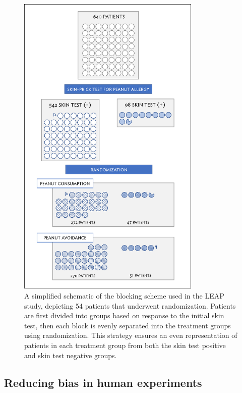 \begin{doublespace}
	\begin{figure}
		\centering
		\includegraphics[width=0.78\textwidth]{ch_intro_to_data_oi_biostat/figures/leapBlocking/leapBlocking.png}
		\caption{A simplified schematic of the blocking scheme used in the LEAP study, depicting 54 patients that underwent randomization. Patients are first divided into groups based on response to the initial skin test, then each block is evenly separated into the treatment groups using randomization. This strategy ensures an even representation of patients in each treatment group from both the skin test positive and skin test negative groups.}
		\label{leapBlocking}
	\end{figure}


\subsection{Reducing bias in human experiments}
\label{biasInHumanExperiments}


\end{doublespace}
